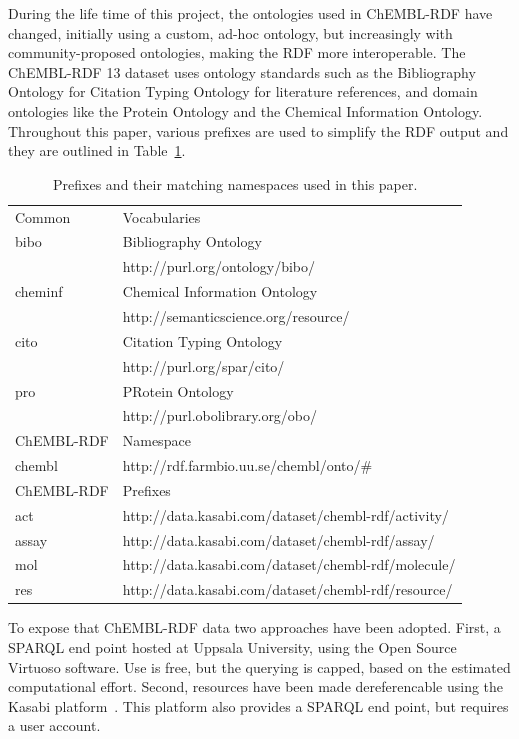 \documentclass[sw]{iosart2c}
\begin{document}
During the life time of this project, the ontologies used in ChEMBL-RDF have changed,
initially using a custom, ad-hoc ontology, but increasingly with community-proposed
ontologies, making the RDF more interoperable. The ChEMBL-RDF 13 dataset uses ontology
standards such as the Bibliography Ontology for Citation Typing Ontology for literature
references, and domain ontologies like the Protein Ontology and the Chemical Information
Ontology. Throughout this paper, various prefixes are used to simplify the RDF output and they are outlined
in Table~\ref{namespaces}.

\begin{table}
\caption{Prefixes and their matching namespaces used in this paper.} \label{namespaces}
\begin{tabular}{ll}
\hline
Common & Vocabularies \\
bibo    & Bibliography Ontology~\cite{Giasson2011} \\
        & http://purl.org/ontology/bibo/ \\
cheminf & Chemical Information Ontology~\cite{Hastings2011} \\
        & http://semanticscience.org/resource/ \\
cito    & Citation Typing Ontology~\cite{Shotton2010} \\
        & http://purl.org/spar/cito/ \\
pro     & PRotein Ontology~\cite{Sidhu2006} \\
        & http://purl.obolibrary.org/obo/ \\

\hline
ChEMBL-RDF & Namespace\\
\hline
chembl & http://rdf.farmbio.uu.se/chembl/onto/\# \\
\hline
ChEMBL-RDF & Prefixes\\
\hline
act    & http://data.kasabi.com/dataset/chembl-rdf/activity/ \\
assay  & http://data.kasabi.com/dataset/chembl-rdf/assay/ \\
mol    & http://data.kasabi.com/dataset/chembl-rdf/molecule/ \\
res    & http://data.kasabi.com/dataset/chembl-rdf/resource/ \\
\hline
\end{tabular}
\end{table}

To expose that ChEMBL-RDF data two approaches have been adopted. First, a SPARQL end point
hosted at Uppsala University, using the Open Source Virtuoso software. Use is free, but the
querying is capped, based on the estimated computational effort. Second, resources have
been made dereferencable using the Kasabi platform~\cite{kasabi}. This platform also provides a SPARQL
end point, but requires a user account.
\end{document}
